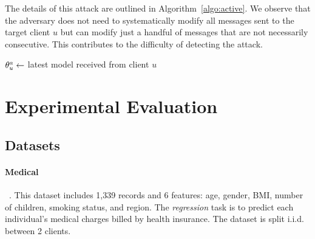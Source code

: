 The details of this attack are outlined in Algorithm~\ref{algo:active}. We observe that the adversary does not need to systematically modify all messages sent to the target client $u$ but can modify just a handful of messages that are not necessarily consecutive. This contributes to the difficulty of detecting the attack.

\begin{algorithm2e}[H]
  \caption{Reconstruction of client-$u$'s local model by an active adversary $a$}
  \label{algo:active}


  $\theta_u^a \leftarrow$ latest model received from client $u$\;


  \;
\end{algorithm2e}

\section{Experimental Evaluation}\label{sec:exp}
\subsection{Datasets} \label{subsec:datasets}
\paragraph{Medical}~\cite{medical_dataset}. This dataset includes 1,339 records and 6 features: age, gender, BMI, number of children, smoking status, and region. The \emph{regression} task is to predict each individual's medical charges billed by health insurance. The dataset is split i.i.d. between 2 clients.

